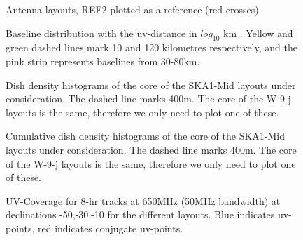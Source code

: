 \documentclass[sfheadings,a4paper,times,9pt,floats,floatfix]{article}
\begin{document}
\begin{figure}[H]
 \tiny{}
 \caption{Antenna layouts, REF2 plotted as a reference (red crosses)}\label{fig:lay}
\end{figure}
\begin{figure}[H]
 \tiny{}
 \caption{Baseline distribution with the uv-distance in $log_{10}$ km . Yellow and green dashed lines mark 10 and 120
kilometres respectively, and the pink strip represents baselines from 30-80km.}\label{fig:hist}
\end{figure}
\begin{figure}[H]
 \centering
 
 \caption{Dish density histograms of the core of the SKA1-Mid layouts under consideration. The dashed line marks 400m. The core
of the W-9-j layouts is the same, therefore we only need to plot one of these.}
\end{figure}
\begin{figure}[H]
 \centering
 
 \caption{Cumulative dish density histograms of the core of the SKA1-Mid layouts under consideration. The dashed line marks 400m.
The core of the W-9-j layouts is the same, therefore we only need to plot one of these.}
\end{figure}
\begin{figure}[H]
 \tiny{}
 \caption{UV-Coverage for 8-hr tracks at 650MHz (50MHz bandwidth) at declinations -50,-30,-10 for the different layouts. Blue
indicates uv-points, red indicates conjugate uv-points.}\label{fig:uvcov}
\end{figure}
\end{document}
